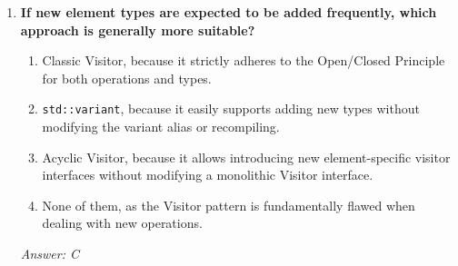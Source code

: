 \begin{enumerate}
    \item \textbf{If new element types are expected to be added frequently, which approach is generally more suitable?}
    \begin{enumerate}[label=\textbf{\Alph*.}]
        \item Classic Visitor, because it strictly adheres to the Open/Closed Principle for both operations and types.
        \item \texttt{std::variant}, because it easily supports adding new types without modifying the variant alias or recompiling.
        \item Acyclic Visitor, because it allows introducing new element-specific visitor interfaces without modifying a monolithic Visitor interface.
        \item None of them, as the Visitor pattern is fundamentally flawed when dealing with new operations.
    \end{enumerate}
    \textit{Answer: C}
\end{enumerate}
